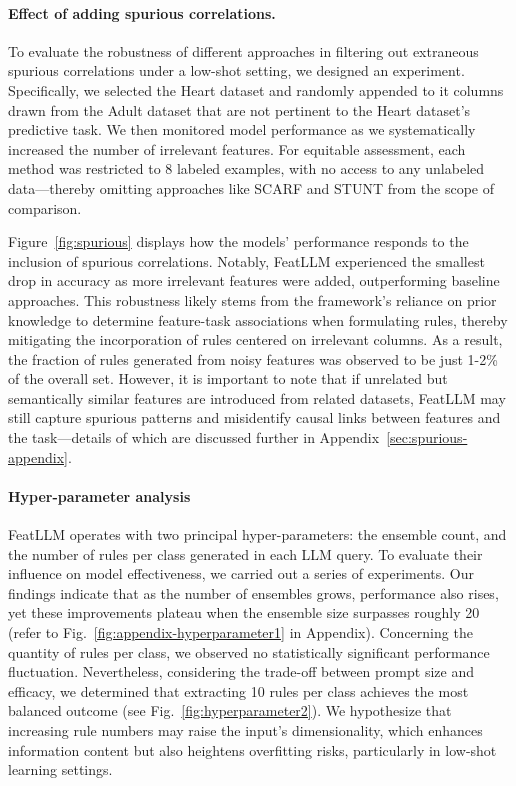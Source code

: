 \paragraph{Effect of adding spurious correlations.} To evaluate the robustness of different approaches in filtering out extraneous spurious correlations under a low-shot setting, we designed an experiment. Specifically, we selected the Heart dataset and randomly appended to it columns drawn from the Adult dataset that are not pertinent to the Heart dataset’s predictive task. We then monitored model performance as we systematically increased the number of irrelevant features. For equitable assessment, each method was restricted to 8 labeled examples, with no access to any unlabeled data—thereby omitting approaches like SCARF and STUNT from the scope of comparison.

Figure~\ref{fig:spurious} displays how the models' performance responds to the inclusion of spurious correlations. Notably, \textsf{FeatLLM} experienced the smallest drop in accuracy as more irrelevant features were added, outperforming baseline approaches. This robustness likely stems from the framework’s reliance on prior knowledge to determine feature-task associations when formulating rules, thereby mitigating the incorporation of rules centered on irrelevant columns. As a result, the fraction of rules generated from noisy features was observed to be just 1-2\% of the overall set. However, it is important to note that if unrelated but semantically similar features are introduced from related datasets, \textsf{FeatLLM} may still capture spurious patterns and misidentify causal links between features and the task—details of which are discussed further in Appendix~\ref{sec:spurious-appendix}.

\vspace*{-0.12in}
\paragraph{Hyper-parameter analysis}
\textsf{FeatLLM} operates with two principal hyper-parameters: the ensemble count, and the number of rules per class generated in each LLM query. To evaluate their influence on model effectiveness, we carried out a series of experiments. Our findings indicate that as the number of ensembles grows, performance also rises, yet these improvements plateau when the ensemble size surpasses roughly 20 (refer to Fig.~\ref{fig:appendix-hyperparameter1} in Appendix). Concerning the quantity of rules per class, we observed no statistically significant performance fluctuation. Nevertheless, considering the trade-off between prompt size and efficacy, we determined that extracting 10 rules per class achieves the most balanced outcome (see Fig.~\ref{fig:hyperparameter2}). We hypothesize that increasing rule numbers may raise the input's dimensionality, which enhances information content but also heightens overfitting risks, particularly in low-shot learning settings.

